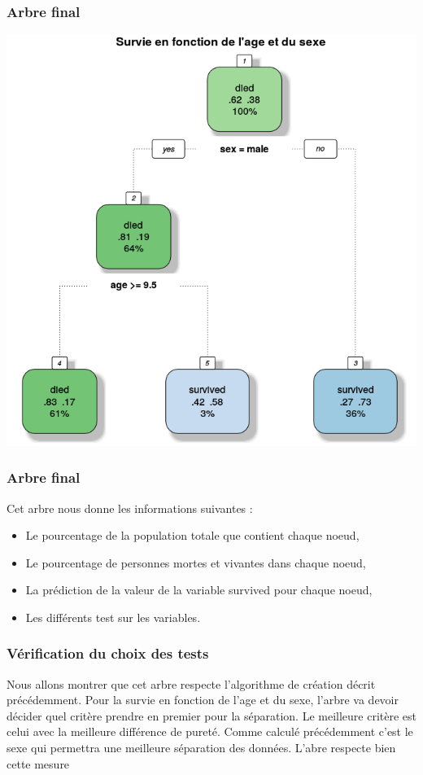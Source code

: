 \documentclass[compress]{beamer}
\begin{document}
\begin{frame}
\frametitle{Arbre final}

      \begin{center}
           \includegraphics[width=\textwidth,height=0.8\textheight,keepaspectratio]{img/fancy.png}
        \end{center}
\end{frame}

\begin{frame}
\frametitle{Arbre final}
Cet arbre nous donne les informations suivantes : \newline
\begin{itemize}
 \item Le pourcentage de la population totale que contient chaque noeud,
 \item Le pourcentage de personnes mortes et vivantes dans chaque noeud,
 \item La prédiction de la valeur de la variable \textrm{survived} pour chaque noeud,
 \item Les différents test sur les variables.
\end{itemize}

\end{frame}
\begin{frame}
 \frametitle{Vérification du choix des tests}
  Nous allons montrer que cet arbre respecte l'algorithme de création décrit précédemment. Pour la survie en fonction de l'age et du sexe, l'arbre va devoir décider quel
 critère prendre en premier pour la séparation. Le meilleure critère est celui avec la meilleure différence de pureté. Comme calculé précédemment c'est
 le sexe qui permettra une meilleure séparation des données. L'abre respecte bien cette mesure
\end{frame}
\end{document}
